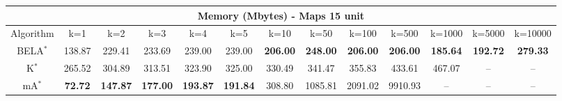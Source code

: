 \begin{tabular}{c|cccccccccccc}\toprule
\multicolumn{13}{c}{Memory (Mbytes) - Maps 15 unit}\\ \midrule
Algorithm & k=1 & k=2 & k=3 & k=4 & k=5 & k=10 & k=50 & k=100 & k=500 & k=1000 & k=5000 & k=10000 \\ \midrule
BELA$^*$ & 138.87 & 229.41 & 233.69 & 239.00 & 239.00 & \textbf{206.00} & \textbf{248.00} & \textbf{206.00} & \textbf{206.00} & \textbf{185.64} & \textbf{192.72} & \textbf{279.33} \\
K$^*$ & 265.52 & 304.89 & 313.51 & 323.90 & 325.00 & 330.49 & 341.47 & 355.83 & 433.61 & 467.07 & -- & -- \\
mA$^*$ & \textbf{72.72} & \textbf{147.87} & \textbf{177.00} & \textbf{193.87} & \textbf{191.84} & 308.80 & 1085.81 & 2091.02 & 9910.93 & -- & -- & -- \\ \bottomrule 
\end{tabular}

